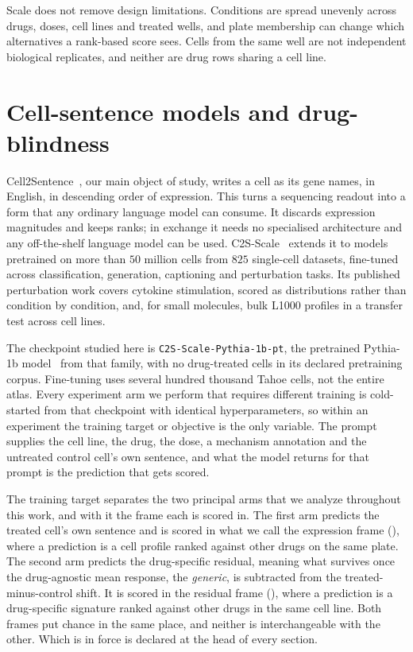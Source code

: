 Scale does not remove design limitations. Conditions are spread unevenly across
drugs, doses, cell lines and treated wells, and plate membership can change
which alternatives a rank-based score sees. Cells from the same well are not
independent biological replicates, and neither are drug rows sharing a cell
line. 

\section{Cell-sentence models and drug-blindness}
\label{sec:intro-model}

Cell2Sentence~\cite{c2s}, our main object of study, writes a cell as its gene names, in English, in descending order of expression. This turns a sequencing readout into a form that any ordinary language model can
consume. It discards expression
magnitudes and keeps ranks; in exchange it needs no specialised architecture and any off-the-shelf language model can be used.
C2S-Scale~\cite{c2sscale} extends it to models pretrained on more than $50$
million cells from $825$ single-cell datasets, fine-tuned across
classification, generation, captioning and perturbation tasks. Its published perturbation work covers cytokine stimulation, scored as distributions rather than condition by condition, and, for small molecules, bulk L1000 profiles in a transfer test across cell lines.

The checkpoint studied here is
\texttt{C2S-Scale-}\allowbreak\texttt{Pythia-}\allowbreak\texttt{1b-pt}, the
pretrained Pythia-1b model~\cite{pythia} from that family, with no drug-treated
cells in its declared pretraining corpus. Fine-tuning uses several hundred
thousand Tahoe cells, not the entire atlas. Every experiment arm we perform that requires different training is cold-started from that
checkpoint with identical hyperparameters, so within an experiment the training
target or objective is the only variable. The prompt supplies the cell line, the
drug, the dose, a mechanism annotation and the untreated control cell's own
sentence, and what the model returns for that prompt is the prediction that gets
scored.

The training target separates the two principal arms that we analyze throughout this work, and with it the frame each
is scored in. The first arm predicts the treated cell's own sentence and is
scored in what we call the expression frame (\Eframe), where a prediction is a cell profile
ranked against other drugs on the same plate. The second arm predicts the
drug-specific residual, meaning what survives once the drug-agnostic mean
response, the \emph{generic}, is subtracted from the treated-minus-control
shift. It is scored in the residual frame (\Rframe), where a prediction is a
drug-specific signature ranked against other drugs in the same cell line. Both
frames put chance in the same place, and neither is interchangeable with the
other. Which is in force is declared at the head of every section.

